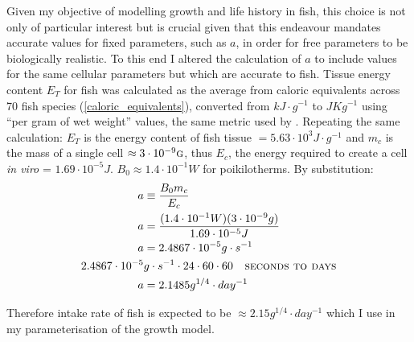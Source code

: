 \documentclass[a4paper]{article} %
\begin{document}
Given my objective of modelling growth and life history in fish, this choice is not only of particular interest but is crucial given that this endeavour mandates accurate values for fixed parameters, such as $a$, in order for free parameters to be biologically realistic. To this end I altered the \textcite{West2001} calculation of $a$ to include values for the same cellular parameters but which are accurate to fish. Tissue energy content $E_T$ for fish was calculated as the average from caloric equivalents across 70 fish species \autocite{Cummins1971, Steimle1980, Hartman1995} (\cref{caloric_equivalents}), converted from $kJ\cdot g^{-1}$ to $JKg^{-1}$ using ``per gram of wet weight'' values, the same metric used by \textcite{West2001}. Repeating the same calculation: $E_T$ is the energy content of fish tissue $= 5.63 \cdot 10^3 J\cdot g^{-1}$ and $m_c$ is the mass of a single cell $\approx 3 \cdot 10^{-9} \textsc{g}$, thus $E_c$, the energy required to create a cell \textit{in viro} = $1.69 \cdot 10^{-5} J$. $B_0 \approx 1.4 \cdot 10^{-1} W$ for poikilotherms. By substitution:
\begin{align*}
    a &\equiv \frac{B_{0}m_{c}}{E_{c}} \\
    a &= \frac{(1.4 \cdot 10^{-1} W)(3 \cdot 10^{-9} g)}{1.69 \cdot 10^{-5} J}\\
    a &= 2.4867 \cdot 10^{-5}g\cdot s^{-1} \\
    2.4867 \cdot 10^{-5}&g\cdot s^{-1} \cdot 24 \cdot 60 \cdot 60 \ \ \textsc{   seconds to days}\\
    a &= 2.1485 g^{1/4}\cdot day^{-1}
\end{align*}

Therefore intake rate of fish is expected to be $\approx 2.15g^{1/4}\cdot day^{-1}$ which I use in my parameterisation of the growth model.
\end{document}
